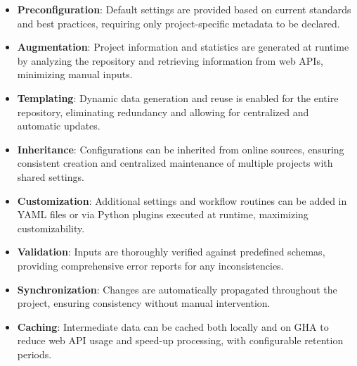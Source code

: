 \documentclass{article}
\begin{document}
\begin{itemize}
    \item \textbf{Preconfiguration}: Default settings are provided based on current standards and best practices, requiring only project-specific metadata to be declared.
    \item \textbf{Augmentation}: Project information and statistics are generated at runtime by analyzing the repository and retrieving information from web APIs, minimizing manual inputs.
    \item \textbf{Templating}: Dynamic data generation and reuse is enabled for the entire repository, eliminating redundancy and allowing for centralized and automatic updates.
    \item \textbf{Inheritance}: Configurations can be inherited from online sources, ensuring consistent creation and centralized maintenance of multiple projects with shared settings.
    \item \textbf{Customization}: Additional settings and workflow routines can be added in YAML files or via Python plugins executed at runtime, maximizing customizability.
    \item \textbf{Validation}: Inputs are thoroughly verified against predefined schemas, providing comprehensive error reports for any inconsistencies.
    \item \textbf{Synchronization}: Changes are automatically propagated throughout the project, ensuring consistency without manual intervention.
    \item \textbf{Caching}: Intermediate data can be cached both locally and on GHA to reduce web API usage and speed-up processing, with configurable retention periods.
\end{itemize}
\end{document}
